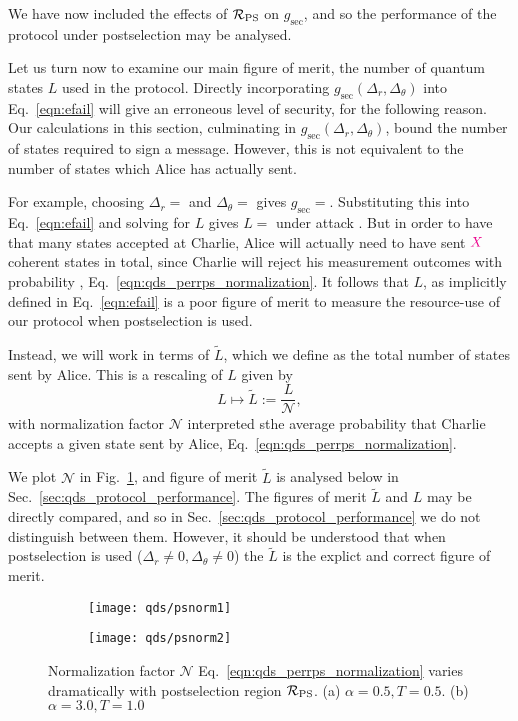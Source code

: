 We have now included the effects of $\mathcal{R}_{\text{PS}}$ on $g_{\text{sec}}$, and so the performance of the protocol under postselection may be analysed.


Let us turn now to examine our main figure of merit, the number of quantum states $L$ used in the protocol. Directly incorporating $g_{\text{sec}}\left(\Delta_r, \Delta_\theta\right)$ into Eq.~\ref{eqn:efail} will give an erroneous level of security, for the following reason. Our calculations in this section, culminating in $g_{\text{sec}}\left(\Delta_r, \Delta_\theta\right)$, bound the number of states required to sign a message. However, this is not equivalent to the number of states which Alice has actually sent. 

For example, choosing $\Delta_r = $ and $\Delta_\theta = $ gives $g_{\text{sec}} = $. Substituting this into Eq.~\ref{eqn:efail} and solving for $L$ gives $L = $ under attack . But in order to have that many states accepted at Charlie, Alice will actually need to have sent $\textcolor{magenta}{X}$ coherent states in total, since Charlie will reject his measurement outcomes with probability , Eq.~\ref{eqn:qds_perrps_normalization}. It follows that $L$, as implicitly defined in Eq.~\ref{eqn:efail} is a poor figure of merit to measure the resource-use of our protocol when postselection is used.

Instead, we will work in terms of $\tilde{L}$, which we define as the total number of states sent by Alice. This is a rescaling of $L$ given by
\begin{equation}
L \mapsto \tilde{L} := \frac{L}{\mathcal{N}},
\end{equation}
with normalization factor $\mathcal{N}$ interpreted sthe average probability that Charlie accepts a given state sent by Alice, Eq.~\ref{eqn:qds_perrps_normalization}.

We plot $\mathcal{N}$ in Fig.~\ref{fig:psnorm}, and figure of merit $\tilde{L}$ is analysed below in Sec.~\ref{sec:qds_protocol_performance}. The figures of merit $\tilde{L}$ and $L$ may be directly compared, and so in Sec.~\ref{sec:qds_protocol_performance} we do not distinguish between them. However, it should be understood that when postselection is used ($\Delta_r \ne 0, \Delta_\theta \ne 0$) the $\tilde{L}$ is the explict and correct figure of merit.

\begin{figure}[htp]
\centering
\begin{subfigure}{0.4\linewidth}
\texttt{[image: qds/psnorm1]}
\caption{}
\end{subfigure}
\begin{subfigure}{0.4\linewidth}
\texttt{[image: qds/psnorm2]}
\caption{}
\end{subfigure}
\caption{\label{fig:psnorm} Normalization factor $\mathcal{N}$ Eq.~\ref{eqn:qds_perrps_normalization} varies dramatically with postselection region $\mathcal{R}_{\text{PS}}$. (a) $\alpha=0.5, T=0.5$. (b) $\alpha=3.0, T=1.0$}
\end{figure}



